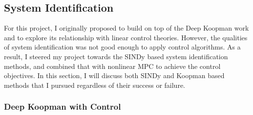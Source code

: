 \documentclass[10pt,twocolumn]{article}
\begin{document}
\subsection{System Identification}

For this project, I originally proposed to build on top of the Deep Koopman work and to
explore its relationship with linear control theories. However, the qualities of system
identification was not good enough to apply control algorithms. As a result, I steered
my project towards the SINDy based system identification methods, and combined that
with nonlinear MPC to achieve the control objectives. In this section, I will discuss
both SINDy and Koopman based methods that I pursued regardless of their success or failure.

\subsubsection{Deep Koopman with Control}\label{sec:deep_koopman}
\end{document}
